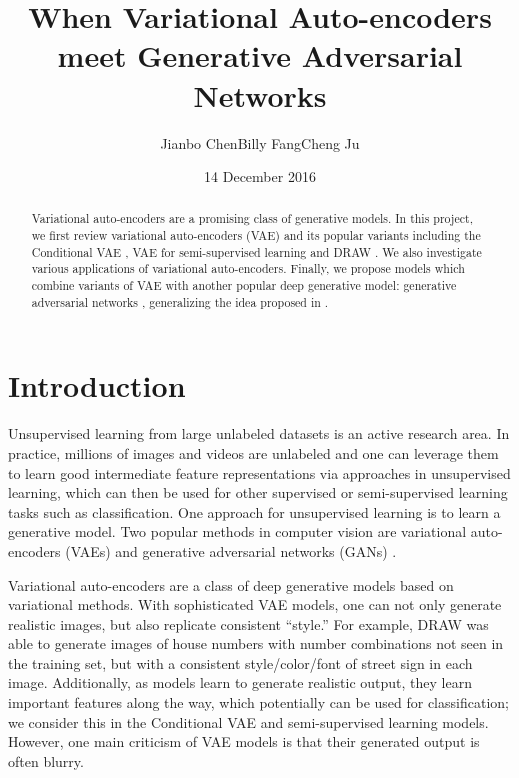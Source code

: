 \documentclass[10pt]{article}
\title{When Variational Auto-encoders meet Generative Adversarial Networks}
\date{14 December 2016}
\author{Jianbo Chen\quad Billy Fang\quad Cheng Ju}
\begin{document}
\maketitle


\begin{abstract}
Variational auto-encoders are a promising class of generative models. In this project, we first review variational auto-encoders (VAE) and its popular variants including the Conditional VAE \cite{sohn2015learning}, VAE for semi-supervised learning \cite{DBLP:journals/corr/KingmaRMW14} and DRAW \cite{chung2015recurrent}. We also investigate various applications of variational auto-encoders.
Finally, we propose models which combine variants of VAE with another popular deep generative model: generative adversarial networks \cite{goodfellow2014gan}, generalizing the idea proposed in \cite{larsen2015autoencoding}.
\end{abstract}


\section{Introduction}
Unsupervised learning from large unlabeled datasets is an active research area.
In practice, millions of images and videos are unlabeled and one can leverage them to learn good intermediate feature representations via approaches in unsupervised learning, which can then be used for other supervised or semi-supervised learning tasks such as classification.
One approach for unsupervised learning is to learn a generative model.
Two popular methods in computer vision are variational auto-encoders (VAEs) \cite{kingma2013auto} and generative adversarial networks (GANs) \cite{goodfellow2014gan}.

Variational auto-encoders are a class of deep generative models based on variational methods. %
With sophisticated VAE models, one can not only generate realistic images, but also replicate consistent ``style.'' For example, DRAW \cite{gregor2015draw} was able to generate images of house numbers with number combinations not seen in the training set, but with a consistent style/color/font of street sign in each image. Additionally, as models learn to generate realistic output, they learn important features along the way, which potentially can be used for classification; we consider this in the Conditional VAE and semi-supervised learning models.
However, one main criticism of VAE models is that their generated output is often blurry.
\end{document}

